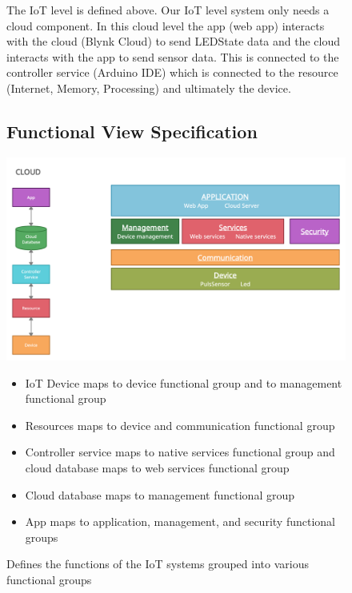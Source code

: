 \documentclass{report}
\begin{document}
\begin{figure}
    \caption{The IoT level is defined above. Our IoT level system only needs a cloud component. In this cloud level the app (web app) interacts with the cloud (Blynk Cloud) to send LEDState data and the cloud interacts with the app to send sensor data. This is connected to the controller service (Arduino IDE) which is connected to the resource (Internet, Memory, Processing) and ultimately the device.}
    \label{fig:image5}
\end{figure}

\begin{figure}
\subsection{Functional View Specification}
    \centering
    \includegraphics[scale=0.15]{images/step7.png}
    \caption{Defines the functions of the IoT systems grouped into various functional groups}
    \begin{itemize}
    \item IoT Device maps to device functional group and to management functional group
    \item Resources maps to device and communication functional group
    \item Controller service maps to native services functional group and cloud database maps to web services functional group
    \item Cloud database maps to management functional group
    \item App maps to application, management, and security functional groups
\end{itemize}
    \label{fig:image6}
\end{figure}
\end{document}
